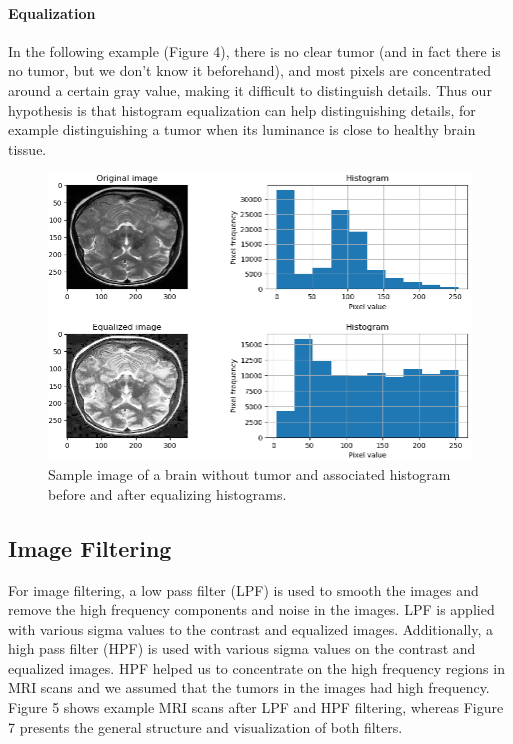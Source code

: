 \documentclass[conference]{IEEEtran}
\begin{document}
\paragraph*{Equalization}
In the following example (Figure 4), there is no clear tumor (and in fact there is no tumor, but we don't know it beforehand), and most pixels are concentrated around a certain gray value, making it difficult to distinguish details. Thus our hypothesis is that histogram equalization can help distinguishing details, for example distinguishing a tumor when its luminance is close to healthy brain tissue. \\
\begin{figure}[h]
\centering
\includegraphics[scale=0.33]{figures/Equalizing.png}
\caption{Sample image of a brain without tumor and associated histogram before and after equalizing histograms.}
\end{figure}

\subsection{Image Filtering}
For image filtering, a low pass filter (LPF) is used to smooth the images and remove the high frequency components and noise in the images. LPF is applied with various sigma values to the contrast and equalized images. Additionally, a high pass filter (HPF) is used with various sigma values on the contrast and equalized images. HPF helped us to concentrate on the high frequency regions in MRI scans and we assumed that the tumors in the images had high frequency. Figure 5 shows example MRI scans after LPF and HPF filtering, whereas Figure 7 presents the general structure and visualization of both filters. 
\end{document}

